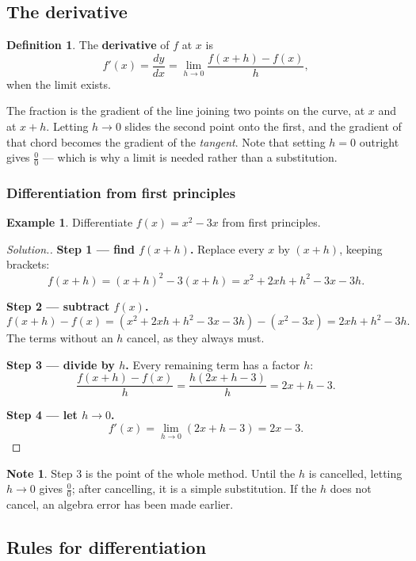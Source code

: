 \documentclass[11pt,a4paper]{article}
\theoremstyle{definition}
\newtheorem{definition}[thm]{Definition}
\newtheorem{example}[thm]{Example}
\newtheorem{note}[thm]{Note}
\newenvironment{solution}
  {\renewcommand{\qedsymbol}{}\begin{proof}[\textit{Solution}.]}
  {\end{proof}}
\begin{document}
\subsection{The derivative}

\begin{definition}
The \textbf{derivative} of $f$ at $x$ is
$$f'(x)=\frac{dy}{dx}=\lim_{h\to 0}\frac{f(x+h)-f(x)}{h},$$
when the limit exists.
\end{definition}

The fraction is the gradient of the line joining two points on the curve, at $x$ and at
$x+h$. Letting $h\to 0$ slides the second point onto the first, and the gradient of that
chord becomes the gradient of the \emph{tangent}. Note that setting $h=0$ outright gives
$\frac{0}{0}$ --- which is why a limit is needed rather than a substitution.

\subsubsection{Differentiation from first principles}

\begin{example}
Differentiate $f(x)=x^2-3x$ from first principles.
\end{example}

\begin{solution}
\textbf{Step 1 --- find $f(x+h)$.} Replace every $x$ by $(x+h)$, keeping brackets:
$$f(x+h)=(x+h)^2-3(x+h)=x^2+2xh+h^2-3x-3h.$$

\textbf{Step 2 --- subtract $f(x)$.}
$$f(x+h)-f(x)=\left(x^2+2xh+h^2-3x-3h\right)-\left(x^2-3x\right)=2xh+h^2-3h.$$
The terms without an $h$ cancel, as they always must.

\textbf{Step 3 --- divide by $h$.} Every remaining term has a factor $h$:
$$\frac{f(x+h)-f(x)}{h}=\frac{h(2x+h-3)}{h}=2x+h-3.$$

\textbf{Step 4 --- let $h\to 0$.}
$$f'(x)=\lim_{h\to 0}(2x+h-3)=2x-3.$$
\end{solution}

\begin{note}
Step 3 is the point of the whole method. Until the $h$ is cancelled, letting $h\to 0$
gives $\frac{0}{0}$; after cancelling, it is a simple substitution. If the $h$ does not
cancel, an algebra error has been made earlier.
\end{note}

\subsection{Rules for differentiation}
\end{document}
